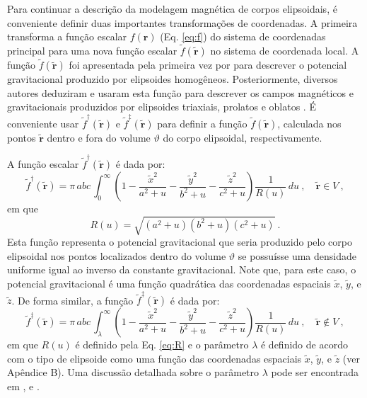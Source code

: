 Para continuar a descrição da modelagem magnética de corpos elipsoidais, é conveniente definir duas importantes transformações de coordenadas. A primeira  transforma a função escalar $f(\mathbf{r})$ (Eq. \ref{eq:f}) do sistema de coordenadas principal para uma nova função escalar $\tilde{f}(\tilde{\mathbf{r}})$ no sistema de coordenada local.
A função $\tilde{f}(\tilde{\mathbf{r}})$ foi apresentada pela primeira vez por \citet{dirichlet1839} para descrever o potencial gravitacional produzido por elipsoides homogêneos. Posteriormente, diversos autores deduziram e usaram esta função para descrever os campos magnéticos e gravitacionais produzidos por elipsoides triaxiais, prolatos e oblatos \citep{maxwell1873, thomson1879, dubois1896, peirce1902, webster1904, kellogg1929, stoner1945, osborn1945, lowes1974,  peake1953, chang1961, clark1986, tejedor1995, sttraton2007}.
É conveniente usar $\tilde{f}^{\dagger}(\tilde{\mathbf{r}})$
e $\tilde{f}^{\ddagger}(\tilde{\mathbf{r}})$ para definir a função $\tilde{f}(\tilde{\mathbf{r}})$, calculada nos pontos $\tilde{\mathbf{r}}$ dentro e fora do volume $\vartheta$ do corpo elipsoidal, respectivamente.

A função escalar $\tilde{f}^{\dagger}(\tilde{\mathbf{r}})$
é dada por:
\begin{equation}
\tilde{f}^{\dagger}(\tilde{\mathbf{r}}) = \pi \, abc \, 
\int_{0}^{\infty} \left( 1 
- \frac{\tilde{x}^{2}}{a^{2} + u} 
- \frac{\tilde{y}^{2}}{b^{2} + u}
- \frac{\tilde{z}^{2}}{c^{2} + u} \right)
\frac{1}{R(u)} \, du \: , \quad \tilde{\mathbf{r}} \in V \: ,
\label{eq:fi-tilde}
\end{equation}
em 	que
\begin{equation}
R(u) = \sqrt{\left( a^{2} + u \right)\left( b^{2} + u \right)\left( c^{2} + u \right)} \: .
\label{eq:R}
\end{equation}
Esta função representa o potencial gravitacional que seria produzido pelo corpo elipsoidal nos pontos localizados dentro do volume $\vartheta$ se possuísse uma densidade uniforme igual ao inverso da constante gravitacional. Note que, para este caso, o potencial gravitacional é uma função quadrática das coordenadas espaciais $\tilde{x}$, $\tilde{y}$, e $\tilde{z}$. De forma similar, a função $\tilde{f}^{\ddagger}(\tilde{\mathbf{r}})$ é dada por:
\begin{equation}
\tilde{f}^{\ddagger}(\tilde{\mathbf{r}}) = \pi \, abc \, 
\int_{\lambda}^{\infty} \left( 1 
- \frac{\tilde{x}^{2}}{a^{2} + u} 
- \frac{\tilde{y}^{2}}{b^{2} + u}
- \frac{\tilde{z}^{2}}{c^{2} + u} \right)
\frac{1}{R(u)} \, du \: , \quad \tilde{\mathbf{r}} \not\in V \: ,
\label{eq:fe-tilde}
\end{equation}
em que $R(u)$ é definido pela Eq. \ref{eq:R} e o parâmetro $\lambda$ é definido de acordo com o tipo de elipsoide como uma função das coordenadas espaciais $\tilde{x}$, $\tilde{y}$, e $\tilde{z}$ (ver Apêndice B). Uma discussão detalhada sobre o parâmetro $\lambda$ pode ser encontrada em \citet[p.~234]{webster1904}, \citet[p.~184]{kellogg1929} e \citet{clark1986}.

